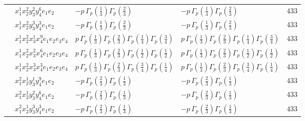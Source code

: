 \documentclass[11pt]{article}
\begin{document}
\begin{table}[ht]
{\begin{tabular}{@{}lllll@{}}
 & $x_{1}^{1} x_{2}^{2} y_{3}^{2} y_{4}^{6} e_{1} e_{2}$ & $- p \, \Gamma_p \left( \frac{1}{3} \right) \Gamma_p \left( \frac{2}{3} \right)$ & $- p \, \Gamma_p \left( \frac{1}{3} \right) \Gamma_p \left( \frac{2}{3} \right)$ & $433$ \\
 & $x_{1}^{1} x_{2}^{2} y_{3}^{3} y_{4}^{3} e_{1} e_{2}$ & $- p \, \Gamma_p \left( \frac{1}{3} \right) \Gamma_p \left( \frac{2}{3} \right)$ & $- p \, \Gamma_p \left( \frac{1}{3} \right) \Gamma_p \left( \frac{2}{3} \right)$ & $433$ \\
 & $x_{1}^{1} x_{2}^{2} x_{3}^{1} x_{4}^{9}  e_{1} e_{2} e_{3} e_{4}$ & $p \, \Gamma_p \left( \frac{1}{3} \right) \Gamma_p \left( \frac{2}{3} \right) \Gamma_p \left( \frac{1}{4} \right) \Gamma_p \left( \frac{3}{4} \right)$ & $p \, \Gamma_p \left( \frac{1}{3} \right) \Gamma_p \left( \frac{2}{3} \right) \Gamma_p \left( \frac{1}{4} \right) \Gamma_p \left( \frac{3}{4} \right)$ & $433$ \\
 & $x_{1}^{1} x_{2}^{2} x_{3}^{2} x_{4}^{6}  e_{1} e_{2} e_{3} e_{4}$ & $p \, \Gamma_p \left( \frac{1}{3} \right) \Gamma_p \left( \frac{2}{3} \right) \Gamma_p \left( \frac{1}{2} \right) \Gamma_p \left( \frac{1}{2} \right)$ & $p \, \Gamma_p \left( \frac{1}{3} \right) \Gamma_p \left( \frac{2}{3} \right) \Gamma_p \left( \frac{1}{2} \right) \Gamma_p \left( \frac{1}{2} \right)$ & $433$ \\
 & $x_{1}^{1} x_{2}^{2} x_{3}^{3} x_{4}^{3}  e_{1} e_{2} e_{3} e_{4}$ & $p \, \Gamma_p \left( \frac{1}{3} \right) \Gamma_p \left( \frac{2}{3} \right) \Gamma_p \left( \frac{3}{4} \right) \Gamma_p \left( \frac{1}{4} \right)$ & $p \, \Gamma_p \left( \frac{1}{3} \right) \Gamma_p \left( \frac{2}{3} \right) \Gamma_p \left( \frac{3}{4} \right) \Gamma_p \left( \frac{1}{4} \right)$ & $433$ \\
 & $x_{1}^{2} x_{2}^{1} y_{3}^{1} y_{4}^{9} e_{1} e_{2}$ & $- p \, \Gamma_p \left( \frac{2}{3} \right) \Gamma_p \left( \frac{1}{3} \right)$ & $- p \, \Gamma_p \left( \frac{2}{3} \right) \Gamma_p \left( \frac{1}{3} \right)$ & $433$ \\
 & $x_{1}^{2} x_{2}^{1} y_{3}^{2} y_{4}^{6} e_{1} e_{2}$ & $- p \, \Gamma_p \left( \frac{2}{3} \right) \Gamma_p \left( \frac{1}{3} \right)$ & $- p \, \Gamma_p \left( \frac{2}{3} \right) \Gamma_p \left( \frac{1}{3} \right)$ & $433$ \\
 & $x_{1}^{2} x_{2}^{1} y_{3}^{3} y_{4}^{3} e_{1} e_{2}$ & $- p \, \Gamma_p \left( \frac{2}{3} \right) \Gamma_p \left( \frac{1}{3} \right)$ & $- p \, \Gamma_p \left( \frac{2}{3} \right) \Gamma_p \left( \frac{1}{3} \right)$ & $433$ \\

\end{tabular}}
\end{table}
\end{document}
